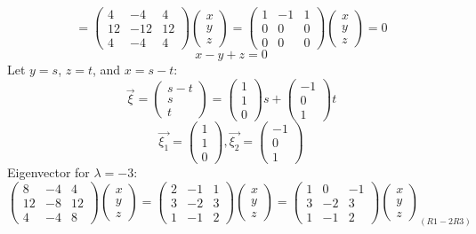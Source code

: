 \documentclass[11pt]{article}
\begin{document}
\[=\begin{pmatrix}
4 & -4 & 4\\
12 & -12 & 12\\
4 & -4 & 4
\end{pmatrix}
\begin{pmatrix}
x\\
y\\
z
\end{pmatrix}=
\begin{pmatrix}
1 & -1 & 1\\
0 & 0 & 0\\
0 & 0 & 0
\end{pmatrix}
\begin{pmatrix}
x\\
y\\
z
\end{pmatrix}=0\]
\[x-y+z=0\]
Let $y=s$, $z=t$, and $x=s-t$:
\[\Vec{\xi}=
\begin{pmatrix}
s-t\\
s\\
t
\end{pmatrix}=
\begin{pmatrix}
1\\
1\\
0
\end{pmatrix}s+
\begin{pmatrix}
-1\\
0\\
1
\end{pmatrix}t\]
\[\Vec{\xi_1}=
\begin{pmatrix}
1\\
1\\
0
\end{pmatrix},
\Vec{\xi_2}=
\begin{pmatrix}
-1\\
0\\
1
\end{pmatrix}\]
Eigenvector for $\lambda=-3$:
\[\begin{pmatrix}
8 & -4 & 4\\
12 & -8 & 12\\
4 & -4 & 8
\end{pmatrix}
\begin{pmatrix}
x\\
y\\
z
\end{pmatrix}=
\begin{pmatrix}
2 & -1 & 1\\
3 & -2 & 3\\
1 & -1 & 2
\end{pmatrix}
\begin{pmatrix}
x\\
y\\
z
\end{pmatrix}=
\begin{pmatrix}
1 & 0 & -1\\
3 & -2 & 3\\
1 & -1 & 2
\end{pmatrix}
\begin{pmatrix}
x\\
y\\
z
\end{pmatrix}_{(R1-2R3)}\]
\end{document}

